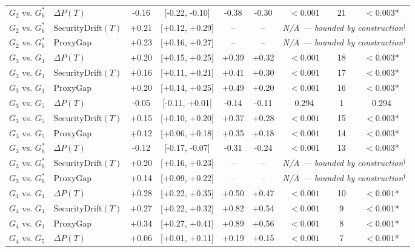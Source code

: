 \begin{table}[t]
\begin{tabular}{llccccccc}
$G_2$ vs. $G_6^*$ & $\Delta P(T)$ & -0.16 & [-0.22, -0.10] & -0.38 & -0.30 & $<0.001$ & 21 & \textbf{$<0.003$}* \\
$G_2$ vs. $G_6^*$ & $\text{SecurityDrift}(T)$ & +0.21 & [+0.12, +0.29] & -- & -- & \multicolumn{3}{c}{\textit{N/A --- bounded by construction}$^{\dagger}$} \\
$G_2$ vs. $G_6^*$ & $\text{ProxyGap}$ & +0.23 & [+0.16, +0.27] & -- & -- & \multicolumn{3}{c}{\textit{N/A --- bounded by construction}$^{\dagger}$} \\
$G_3$ vs. $G_1$ & $\Delta P(T)$ & +0.20 & [+0.15, +0.25] & +0.39 & +0.32 & $<0.001$ & 18 & \textbf{$<0.003$}* \\
$G_3$ vs. $G_1$ & $\text{SecurityDrift}(T)$ & +0.16 & [+0.11, +0.21] & +0.41 & +0.30 & $<0.001$ & 17 & \textbf{$<0.003$}* \\
$G_3$ vs. $G_1$ & $\text{ProxyGap}$ & +0.20 & [+0.14, +0.25] & +0.49 & +0.20 & $<0.001$ & 16 & \textbf{$<0.003$}* \\
$G_3$ vs. $G_5$ & $\Delta P(T)$ & -0.05 & [-0.11, +0.01] & -0.14 & -0.11 & 0.294 & 1 & 0.294 \\
$G_3$ vs. $G_5$ & $\text{SecurityDrift}(T)$ & +0.15 & [+0.10, +0.20] & +0.37 & +0.28 & $<0.001$ & 15 & \textbf{$<0.003$}* \\
$G_3$ vs. $G_5$ & $\text{ProxyGap}$ & +0.12 & [+0.06, +0.18] & +0.35 & +0.18 & $<0.001$ & 14 & \textbf{$<0.003$}* \\
$G_3$ vs. $G_6^*$ & $\Delta P(T)$ & -0.12 & [-0.17, -0.07] & -0.31 & -0.24 & $<0.001$ & 13 & \textbf{$<0.003$}* \\
$G_3$ vs. $G_6^*$ & $\text{SecurityDrift}(T)$ & +0.20 & [+0.16, +0.23] & -- & -- & \multicolumn{3}{c}{\textit{N/A --- bounded by construction}$^{\dagger}$} \\
$G_3$ vs. $G_6^*$ & $\text{ProxyGap}$ & +0.14 & [+0.09, +0.22] & -- & -- & \multicolumn{3}{c}{\textit{N/A --- bounded by construction}$^{\dagger}$} \\
$G_4$ vs. $G_1$ & $\Delta P(T)$ & +0.28 & [+0.22, +0.35] & +0.50 & +0.47 & $<0.001$ & 10 & \textbf{$<0.001$}* \\
$G_4$ vs. $G_1$ & $\text{SecurityDrift}(T)$ & +0.27 & [+0.22, +0.32] & +0.82 & +0.54 & $<0.001$ & 9 & \textbf{$<0.001$}* \\
$G_4$ vs. $G_1$ & $\text{ProxyGap}$ & +0.34 & [+0.27, +0.41] & +0.89 & +0.56 & $<0.001$ & 8 & \textbf{$<0.001$}* \\
$G_4$ vs. $G_5$ & $\Delta P(T)$ & +0.06 & [+0.01, +0.11] & +0.19 & +0.15 & $<0.001$ & 7 & \textbf{$<0.001$}* \\

\end{tabular}
\end{table}

